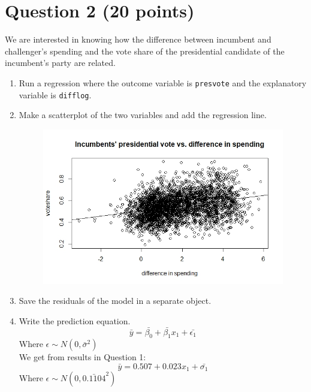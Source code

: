 \documentclass[12pt,letterpaper]{article}
\begin{document}
\newpage

\section*{Question 2 (20 points)}
\noindent We are interested in knowing how the difference between incumbent and challenger's spending and the vote share of the presidential candidate of the incumbent's party are related.	\vspace{.25cm}
\begin{enumerate}
	\item Run a regression where the outcome variable is \texttt{presvote} and the explanatory variable is \texttt{difflog}.
	
	
	\vspace{.5cm}
	
	\item Make a scatterplot of the two variables and add the regression line.
	\begin{figure}[h!]
		\centering
		\label{figure2}
		\includegraphics[width=\textwidth]{Q2.jpeg}
	\end{figure}		
	\vspace{.5cm}
	\item Save the residuals of the model in a separate object.
	
	\vspace{.5cm}		
	\item Write the prediction equation.
	$$\bar{y} = \bar{\beta_0} + \bar{\beta_1}x_1 + \bar{\epsilon_1}$$ Where $\epsilon \sim N(0, \bar{\sigma}^2)$
	\vspace{.5cm}		
	\\We get from results in Question 1:
	$$\bar{y} = 0.507 + 0.023x_1 + \bar{\sigma_1}$$ Where $\epsilon \sim N(0, \bar{0.1104}^2)$
	
\end{enumerate}
	
\end{document}
